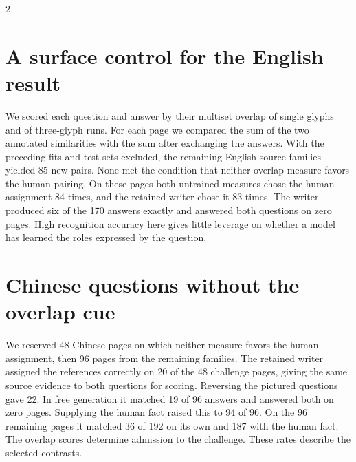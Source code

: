 \begin{multicols}{2}
\section*{A surface control for the English result}
We scored each question and answer by their multiset overlap of single glyphs and of three-glyph runs. For each page we compared the sum of the two annotated similarities with the sum after exchanging the answers. With the preceding fits and test sets excluded, the remaining English source families yielded 85 new pairs. None met the condition that neither overlap measure favors the human pairing. On these pages both untrained measures chose the human assignment 84 times, and the retained writer chose it 83 times. The writer produced six of the 170 answers exactly and answered both questions on zero pages. High recognition accuracy here gives little leverage on whether a model has learned the roles expressed by the question.
\section*{Chinese questions without the overlap cue}
We reserved 48 Chinese pages on which neither measure favors the human assignment, then 96 pages from the remaining families. The retained writer assigned the references correctly on 20 of the 48 challenge pages, giving the same source evidence to both questions for scoring. Reversing the pictured questions gave 22. In free generation it matched 19 of 96 answers and answered both on zero pages. Supplying the human fact raised this to 94 of 96. On the 96 remaining pages it matched 36 of 192 on its own and 187 with the human fact. The overlap scores determine admission to the challenge. These rates describe the selected contrasts.
\end{multicols}
\newpage
